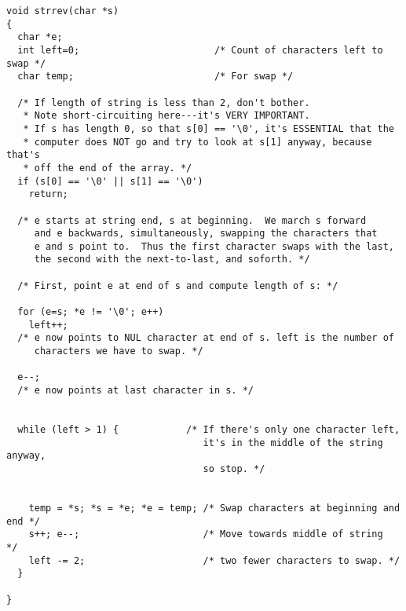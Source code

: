 \begin{verbatim}
void strrev(char *s)
{
  char *e;               
  int left=0;                        /* Count of characters left to swap */
  char temp;                         /* For swap */

  /* If length of string is less than 2, don't bother.
   * Note short-circuiting here---it's VERY IMPORTANT.
   * If s has length 0, so that s[0] == '\0', it's ESSENTIAL that the
   * computer does NOT go and try to look at s[1] anyway, because that's
   * off the end of the array. */
  if (s[0] == '\0' || s[1] == '\0')
    return;
  
  /* e starts at string end, s at beginning.  We march s forward
     and e backwards, simultaneously, swapping the characters that
     e and s point to.  Thus the first character swaps with the last, 
     the second with the next-to-last, and soforth. */

  /* First, point e at end of s and compute length of s: */

  for (e=s; *e != '\0'; e++)
    left++;
  /* e now points to NUL character at end of s. left is the number of 
     characters we have to swap. */

  e--;        
  /* e now points at last character in s. */


  while (left > 1) {            /* If there's only one character left, 
                                   it's in the middle of the string anyway,
                                   so stop. */
    

    temp = *s; *s = *e; *e = temp; /* Swap characters at beginning and end */
    s++; e--;                      /* Move towards middle of string  */
    left -= 2;                     /* two fewer characters to swap. */
  }

}
\end{verbatim}
